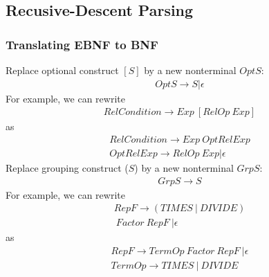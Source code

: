 \subsection{Recusive-Descent Parsing}
\subsubsection{Translating EBNF to BNF}

Replace optional construct $[S]$ by a new nonterminal $OptS$:
\begin{align*}
    OptS \rightarrow S | \epsilon
\end{align*}
For example, we can rewrite
\begin{align*}
    RelCondition \rightarrow Exp \ [RelOp \ Exp]
\end{align*}
as
\begin{align*}
    RelCondition \rightarrow Exp \ OptRelExp \\
    OptRelExp \rightarrow RelOp \ Exp | \epsilon
\end{align*}
Replace grouping construct ($S$) by a new nonterminal $GrpS$:
\begin{align*}
    GrpS \rightarrow S
\end{align*}
For example, we can rewrite
\begin{align*}
    RepF \rightarrow (TIMES \ | \ DIVIDE) \\ \ Factor \ RepF \ | \epsilon
\end{align*}
as 
\begin{align*}
    RepF \rightarrow TermOp \ Factor \ RepF \ | \epsilon \\
    TermOp \rightarrow TIMES \ | \ DIVIDE
\end{align*}